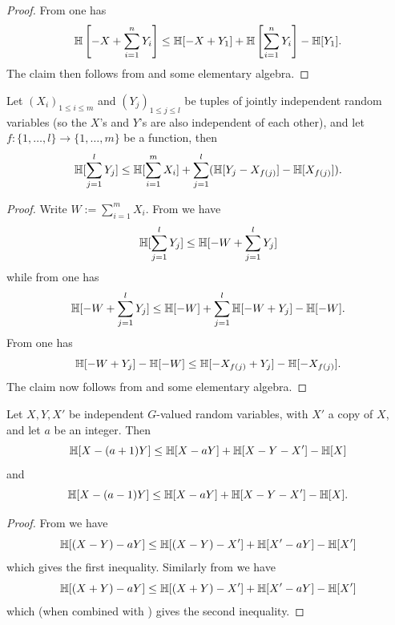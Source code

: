 \begin{proof}\leanok
  From  one has
  $$ \mathbb{H}\left[-X + \sum_{i=1}^n Y_i\right] \leq \mathbb{H}[ - X + Y_1 ] + \mathbb{H}\left[ \sum_{i=1}^n Y_i \right] - \mathbb{H}[Y_1].$$
  The claim then follows from  and some elementary algebra.
\end{proof}

\begin{lemma}\label{compare-sums}\leanok  Let $(X_i)_{1 \leq i \leq m}$ and $(Y_j)_{1 \leq j \leq l}$ be tuples of jointly independent random variables (so the $X$'s and $Y$'s are also independent of each other), and let $f: \{1,\dots,l\} \to \{1,\dots,m\}$ be a function, then
  $$ \mathbb{H}[\sum_{j=1}^l Y_j] \leq \mathbb{H}[ \sum_{i=1}^m X_i ] + \sum_{j=1}^l (\mathbb{H}[ Y_j - X_{f(j)}] - \mathbb{H}[X_{f(j)}]).$$
\end{lemma}

\begin{proof}\leanok  Write $W := \sum_{i=1}^m X_i$.  From  we have
$$ \mathbb{H}[\sum_{j=1}^l Y_j]  \leq \mathbb{H}[-W + \sum_{j=1}^l Y_j]$$
while from  one has
$$ \mathbb{H}[-W + \sum_{j=1}^l Y_j] \leq \mathbb{H}[-W] + \sum_{j=1}^l \mathbb{H}[-W + Y_j] - \mathbb{H}[-W].$$
From  one has
$$ \mathbb{H}[-W + Y_j] - \mathbb{H}[-W] \leq \mathbb{H}[-X_{f(j)} + Y_j] - \mathbb{H}[-X_{f(j)}].$$
The claim now follows from  and some elementary algebra.
\end{proof}

\begin{lemma}
  \label{sum-dilate-I}
  \leanok

  Let $X,Y,X'$ be independent $G$-valued random variables, with $X'$ a copy of $X$,
  and let $a$ be an integer.  Then
  $$\mathbb{H}[X-(a+1)Y] \leq \mathbb{H}[X-aY] + \mathbb{H}[X-Y-X'] - \mathbb{H}[X]$$
  and
  $$\mathbb{H}[X-(a-1)Y] \leq \mathbb{H}[X-aY] + \mathbb{H}[X-Y-X'] - \mathbb{H}[X].$$
\end{lemma}
\begin{proof}
  \leanok

  From  we have
  $$ \mathbb{H}[(X-Y)-aY] \leq \mathbb{H}[(X-Y) - X'] + \mathbb{H}[X'-aY] - \mathbb{H}[X']$$
  which gives the first inequality.  Similarly from  we have
  $$ \mathbb{H}[(X+Y)-aY] \leq \mathbb{H}[(X+Y) - X'] + \mathbb{H}[X'-aY] - \mathbb{H}[X']$$
  which (when combined with ) gives the second inequality.
\end{proof}


